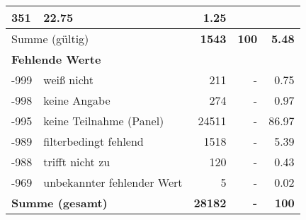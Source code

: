 \begin{longtable}{lXrrr}
       \num{351} &
       \num[round-mode=places,round-precision=2]{22.75} &
         \num[round-mode=places,round-precision=2]{1.25} \\
     \midrule
     \multicolumn{2}{l}{Summe (gültig)} &
       \textbf{\num{1543}} &
     \textbf{100} &
       \textbf{\num[round-mode=places,round-precision=2]{5.48}} \\
     \multicolumn{5}{l}{\textbf{Fehlende Werte}}\\
       -999 &
       weiß nicht &
         \num{211} &
        - &
         \num[round-mode=places,round-precision=2]{0.75} \\
       -998 &
       keine Angabe &
         \num{274} &
        - &
         \num[round-mode=places,round-precision=2]{0.97} \\
       -995 &
       keine Teilnahme (Panel) &
         \num{24511} &
        - &
         \num[round-mode=places,round-precision=2]{86.97} \\
       -989 &
       filterbedingt fehlend &
         \num{1518} &
        - &
         \num[round-mode=places,round-precision=2]{5.39} \\
       -988 &
       trifft nicht zu &
         \num{120} &
        - &
         \num[round-mode=places,round-precision=2]{0.43} \\
       -969 &
       unbekannter fehlender Wert &
         \num{5} &
        - &
         \num[round-mode=places,round-precision=2]{0.02} \\
     \midrule
     \multicolumn{2}{l}{\textbf{Summe (gesamt)}} &
          \textbf{\num{28182}} &
        \textbf{-} &
        \textbf{100} \\
     \bottomrule
     \end{longtable}
     
